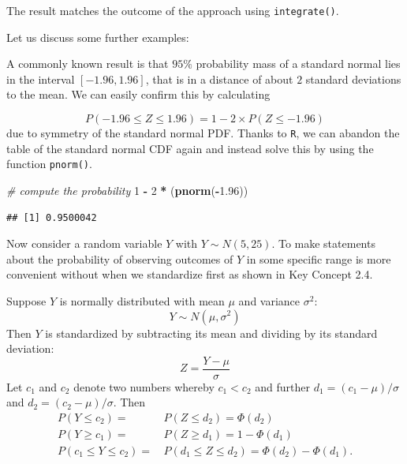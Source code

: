 \documentclass[]{book}
\newenvironment{Shaded}{\begin{snugshade}}{\end{snugshade}}
\newcommand{\KeywordTok}[1]{\textcolor[rgb]{0.13,0.29,0.53}{\textbf{#1}}}
\newcommand{\DecValTok}[1]{\textcolor[rgb]{0.00,0.00,0.81}{#1}}
\newcommand{\FloatTok}[1]{\textcolor[rgb]{0.00,0.00,0.81}{#1}}
\newcommand{\StringTok}[1]{\textcolor[rgb]{0.31,0.60,0.02}{#1}}
\newcommand{\CommentTok}[1]{\textcolor[rgb]{0.56,0.35,0.01}{\textit{#1}}}
\newcommand{\OperatorTok}[1]{\textcolor[rgb]{0.81,0.36,0.00}{\textbf{#1}}}
\newcommand{\NormalTok}[1]{#1}
\theoremstyle{definition}
\theoremstyle{definition}
\theoremstyle{definition}
\theoremstyle{remark}
\begin{document}
The result matches the outcome of the approach using
\texttt{integrate()}.

Let us discuss some further examples:

A commonly known result is that \(95\%\) probability mass of a standard
normal lies in the interval \([-1.96, 1.96]\), that is in a distance of
about \(2\) standard deviations to the mean. We can easily confirm this
by calculating

\[ P(-1.96 \leq Z \leq 1.96) = 1-2\times P(Z \leq -1.96) \] due to
symmetry of the standard normal PDF. Thanks to \texttt{R}, we can
abandon the table of the standard normal CDF again and instead solve
this by using the function \texttt{pnorm()}.

\begin{Shaded}
\begin{Highlighting}[]
\CommentTok{# compute the probability}
\DecValTok{1} \OperatorTok{-}\StringTok{ }\DecValTok{2} \OperatorTok{*}\StringTok{ }\NormalTok{(}\KeywordTok{pnorm}\NormalTok{(}\OperatorTok{-}\FloatTok{1.96}\NormalTok{)) }
\end{Highlighting}
\end{Shaded}

\begin{verbatim}
## [1] 0.9500042
\end{verbatim}

Now consider a random variable \(Y\) with \(Y \sim N(5, 25)\). To make
statements about the probability of observing outcomes of \(Y\) in some
specific range is more convenient without when we standardize first as
shown in Key Concept 2.4.

\begin{keyconcepts}{2.4}

Suppose $Y$ is normally distributed with mean $\mu$ and variance $\sigma^2$: $$Y
\sim N(\mu, \sigma^2)$$ Then $Y$ is standardized by subtracting its mean and
dividing by its standard deviation: $$ Z = \frac{Y -\mu}{\sigma} $$ Let $c_1$
and $c_2$ denote two numbers whereby $c_1 < c_2$ and further $d_1 = (c_1 - \mu)
/ \sigma$ and $d_2 = (c_2 - \mu)/\sigma$. Then
\begin{align*} 
P(Y \leq c_2) =& \, P(Z \leq d_2) = \Phi(d_2) \\ 
P(Y \geq c_1) =& \, P(Z \geq d_1) = 1 - \Phi(d_1) \\ 
P(c_1 \leq Y \leq c_2) =& \, P(d_1 \leq Z \leq d_2) = \Phi(d_2) - \Phi(d_1). 
\end{align*}
\end{keyconcepts}
\end{document}
